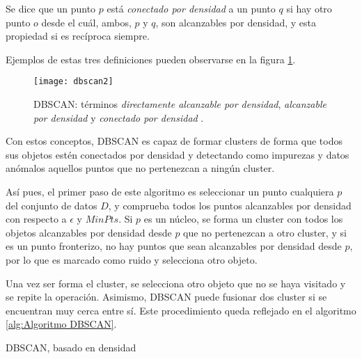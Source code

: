 \documentclass[10pt, a4paper]{article}
\begin{document}
Se dice que un punto $p$ está \textit{conectado por densidad} a un punto $q$ si hay otro punto $o$ desde el cuál, ambos, $p$ y $q$, son alcanzables por densidad, y esta propiedad si es recíproca siempre.  

Ejemplos de estas tres definiciones pueden observarse en la figura \ref{fig:dbscan2}.

\begin{figure}[ht]
\centering
\texttt{[image: dbscan2]}
\caption{DBSCAN: términos \textit{directamente alcanzable por densidad}, \textit{alcanzable por densidad} y \textit{conectado por densidad} \cite{DBSCAN 2}.}
\label{fig:dbscan2}
\end{figure}

Con estos conceptos, DBSCAN es capaz de formar clusters de forma que todos sus objetos estén conectados por densidad y detectando como impurezas y datos anómalos aquellos puntos que no pertenezcan a ningún cluster.

Así pues, el primer paso de este algoritmo es seleccionar un punto cualquiera $p$ del conjunto de datos $D$, y comprueba todos los puntos alcanzables por densidad con respecto a $\epsilon$ y $MinPts$. Si $p$ es un núcleo, se forma un cluster con todos los objetos alcanzables por densidad desde $p$ que no pertenezcan a otro cluster, y si es un punto fronterizo, no hay puntos que sean alcanzables por densidad desde $p$, por lo que es marcado como ruido y selecciona otro objeto. 

Una vez ser forma el cluster, se selecciona otro objeto que no se haya visitado y se repite la operación. Asimismo, DBSCAN puede fusionar dos cluster si se encuentran muy cerca entre sí. Este procedimiento queda reflejado en el algoritmo \ref{alg:Algoritmo DBSCAN}.



\begin{algorithm}[!ht]
\SetAlgoLined
  \LinesNumbered
  \DontPrintSemicolon
  \caption{DBSCAN, basado en densidad}
  \label{alg:Algoritmo DBSCAN}
\end{algorithm}
\end{document}
